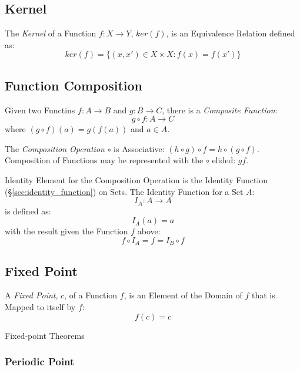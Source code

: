 \subsection{Kernel}\label{sec:kernel}

The \emph{Kernel} of a Function $f : X \rightarrow Y$, $ker(f)$, is an
Equivalence Relation defined as:
\[
  ker(f) = \{ (x,x') \in X \times X : f(x) = f(x') \}
\]



\subsection{Function Composition}\label{sec:function_composition}

Given two Functins $f : A \rightarrow B$ and $g : B \rightarrow C$,
there is a \emph{Composite Function}:
\[
  g \circ f : A \rightarrow C
\]
where $(g \circ f)(a) = g(f(a))$ and $a \in A$.

The \emph{Composition Operation} $\circ$ is Associative: $(h \circ g)
\circ f = h \circ (g \circ f)$. Composition of Functions may be
represented with the $\circ$ elided: $gf$.

Identity Element for the Composition Operation is the Identity
Function (\S\ref{sec:identity_function}) on Sets. The Identity
Function for a Set $A$:
\[
  I_A : A \rightarrow A
\]
is defined as:
\[
  I_A(a) = a
\]
with the result given the Function $f$ above:
\[
  f \circ I_A = f = I_B \circ f
\]



\subsection{Fixed Point}\label{sec:fixed_point}

A \emph{Fixed Point}, $c$, of a Function $f$, is an Element of the
Domain of $f$ that is Mapped to itself by $f$:
\[
  f(c) = c
\]

Fixed-point Theorems



\subsubsection{Periodic Point}\label{sec:periodic_point}

